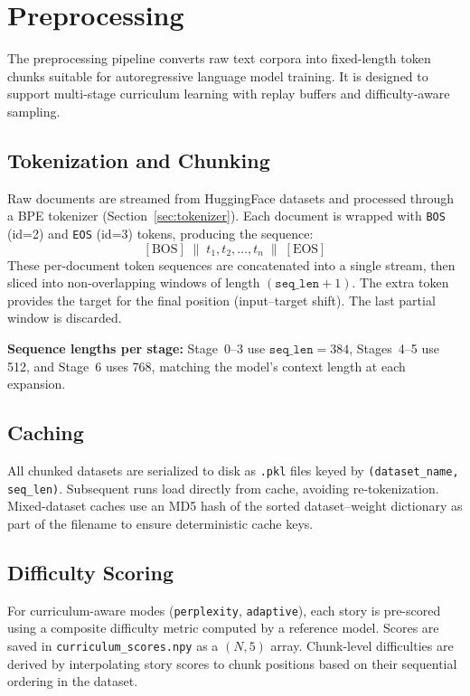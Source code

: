 \section{Preprocessing}

The preprocessing pipeline converts raw text corpora into fixed-length token
chunks suitable for autoregressive language model training.  It is designed to
support multi-stage curriculum learning with replay buffers and
difficulty-aware sampling.

\subsection{Tokenization and Chunking}

Raw documents are streamed from HuggingFace datasets and processed through a
BPE tokenizer (Section~\ref{sec:tokenizer}).  Each document is wrapped with
\texttt{BOS} (id=2) and \texttt{EOS} (id=3) tokens, producing the sequence:
\[
[\text{BOS}] \;\|\; t_1, t_2, \ldots, t_n \;\|\; [\text{EOS}]
\]
These per-document token sequences are concatenated into a single stream, then
sliced into non-overlapping windows of length $(\texttt{seq\_len} + 1)$.  The
extra token provides the target for the final position (input--target shift).
The last partial window is discarded.

\textbf{Sequence lengths per stage:} Stage~0--3 use $\texttt{seq\_len}=384$,
Stages~4--5 use 512, and Stage~6 uses 768, matching the model's context length
at each expansion.

\subsection{Caching}

All chunked datasets are serialized to disk as \texttt{.pkl} files keyed by
\texttt{(dataset\_name, seq\_len)}.  Subsequent runs load directly from cache,
avoiding re-tokenization.  Mixed-dataset caches use an MD5 hash of the
sorted dataset--weight dictionary as part of the filename to ensure
deterministic cache keys.

\subsection{Difficulty Scoring}

For curriculum-aware modes (\texttt{perplexity}, \texttt{adaptive}), each
story is pre-scored using a composite difficulty metric computed by a
reference model.  Scores are saved in \texttt{curriculum\_scores.npy} as a
$(N, 5)$ array.  Chunk-level difficulties are derived by interpolating story
scores to chunk positions based on their sequential ordering in the dataset.

